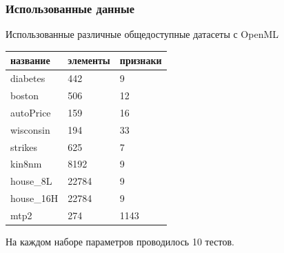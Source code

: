 \documentclass{beamer}
\begin{document}
\begin{frame}
    \frametitle{Использованные данные}
    Использованные различные общедоступные датасеты с OpenML

    \vfill
    \begin{center}
        \begin{tabular}{|l|l|l|}

        \hline

        название        & элементы  & признаки \\

        \hline

        diabetes        & 442    & 9     \\
        boston          & 506    & 12    \\
        autoPrice       & 159    & 16    \\
        wisconsin       & 194    & 33    \\
        strikes         & 625    & 7     \\
        kin8nm          & 8192   & 9     \\
        house\_8L       & 22784  & 9     \\
        house\_16H      & 22784  & 9     \\
        mtp2            & 274    & 1143  \\

        \hline

    \end{tabular}

    \vfill
    На каждом наборе параметров проводилось 10 тестов.
    \end{center}
\end{frame}
\end{document}
